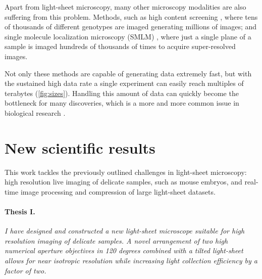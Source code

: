 \documentclass{booklet_style}
\begin{document}
Apart from light-sheet microscopy, many other microscopy modalities are also suffering from this problem. Methods, such as high content screening \cite{carpenter_systematic_2004,echeverri_high-throughput_2006,pepperkok_high-throughput_2006}, where tens of thousands of different genotypes are imaged generating millions of images; and single molecule localization microscopy (SMLM) \cite{betzig_imaging_2006,hess_ultra-high_2006,rust_sub-diffraction-limit_2006}, where just a single plane of a sample is imaged hundreds of thousands of times to acquire super-resolved images.

Not only these methods are capable of generating data extremely fast, but with the sustained high data rate a single experiment can easily reach multiples of terabytes (\autoref{fig:sizes}). Handling this amount of data can quickly become the bottleneck for many discoveries, which is a more and more common issue in biological research \cite{wollman_high_2007,reynaud_guide_2015,perkel_struggle_2016}. 








\section{New scientific results}

This work tackles the previously outlined challenges in light-sheet microscopy: high resolution live imaging of delicate samples, such as mouse embryos, and real-time image processing and compression of large light-sheet datasets.

\paragraph{Thesis I.}\textit{I have designed and constructed a new light-sheet microscope suitable for high resolution imaging of delicate samples. A novel arrangement of two high numerical aperture objectives in 120 degrees combined with a tilted light-sheet allows for near isotropic resolution while increasing light collection efficiency by a factor of two.}
  
\end{document}
